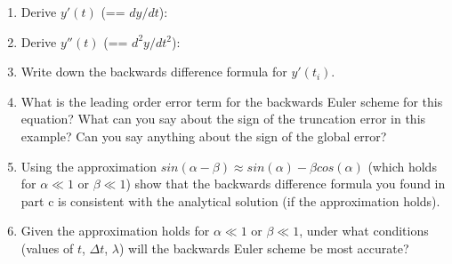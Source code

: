 \documentclass[12pt]{article}
\begin{document}
\begin{enumerate}[nosep]
\item Derive $y'(t)$ (== $dy/dt$):
\vspace{0.1in}
\item Derive $y''(t)$ (== $d^2y/dt^2$):
\vspace{0.1in}
\item Write down the backwards difference formula for $y'(t_i)$.
\vspace{0.6in}
\item What is the leading order error term for the backwards Euler scheme for this equation? What can you say about the sign of the truncation error in this example? Can you say anything about the sign of the global error?
\vspace{0.7in}
\item Using the approximation $sin(\alpha - \beta) \approx sin(\alpha) - \beta cos(\alpha)$ (which holds for $\alpha \ll 1$ or $\beta \ll 1$) show that the backwards difference formula you found in part c is consistent with the analytical solution (if the approximation holds).
\vspace{1.3in}
\item Given the approximation holds for $\alpha \ll 1$ or $\beta \ll 1$, under what conditions (values of $t$, $\Delta t$, $\lambda$) will the backwards Euler scheme be most accurate?
\end{enumerate}
\end{document}

